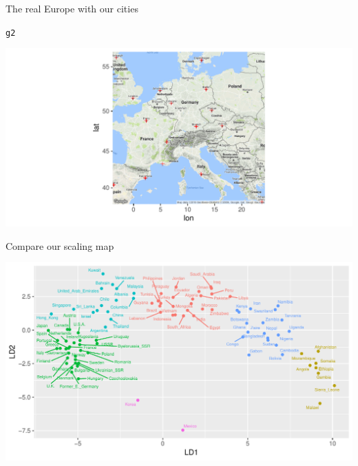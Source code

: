 \documentclass[unknownkeysallowed]{beamer}\usepackage[]{graphicx}\usepackage[]{color}
\makeatletter
\def\maxwidth{ %
  \ifdim\Gin@nat@width>\linewidth
    \linewidth
  \else
    \Gin@nat@width
  \fi
}
\newcommand{\hlstd}[1]{\textcolor[rgb]{0.345,0.345,0.345}{#1}}%
\newenvironment{kframe}{%
 \def\at@end@of@kframe{}%
 \ifinner\ifhmode%
  \def\at@end@of@kframe{\end{minipage}}%
  \begin{minipage}{\columnwidth}%
 \fi\fi%
 \def\FrameCommand##1{\hskip\@totalleftmargin \hskip-\fboxsep
 \colorbox{shadecolor}{##1}\hskip-\fboxsep
     \hskip-\linewidth \hskip-\@totalleftmargin \hskip\columnwidth}%
 \MakeFramed {\advance\hsize-\width
   \@totalleftmargin\z@ \linewidth\hsize
   \@setminipage}}%
 {\par\unskip\endMakeFramed%
 \at@end@of@kframe}
\newenvironment{knitrout}{}{} %
\makeatother
\begin{document}
\begin{frame}[fragile]{The real Europe with our cities}
  
\begin{knitrout}
\color{fgcolor}\begin{kframe}
\begin{alltt}
\hlstd{g2}
\end{alltt}
\end{kframe}
\includegraphics[width=\maxwidth]{figure/unnamed-chunk-397-1} 

\end{knitrout}
\end{frame}

\begin{frame}[fragile]{Compare our scaling map}
  
\begin{knitrout}
\color{fgcolor}
\includegraphics[width=\maxwidth]{figure/unnamed-chunk-398-1} 

\end{knitrout}
  
\end{frame}
\end{document}
